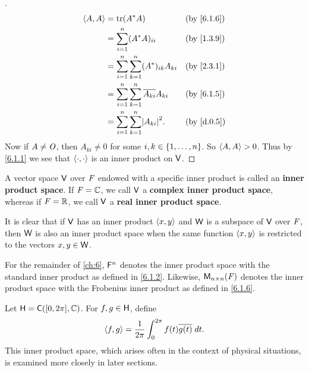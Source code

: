 \begin{proof}[]
\begin{align*}
    \inn{A, A} & = \tr(A^* A)                                           &  & \by{6.1.6} \\
               & = \sum_{i = 1}^n (A^* A)_{i i}                         &  & \by{1.3.9} \\
               & = \sum_{i = 1}^n \sum_{k = 1}^n (A^*)_{i k} A_{k i}    &  & \by{2.3.1} \\
               & = \sum_{i = 1}^n \sum_{k = 1}^n \conj{A_{k i}} A_{k i} &  & \by{6.1.5} \\
               & = \sum_{i = 1}^n \sum_{k = 1}^n \abs{A_{k i}}^2.       &  & \by{d.0.5}
  \end{align*}
  Now if \(A \neq \mathit{O}\), then \(A_{k i} \neq 0\) for some \(i, k \in \left\lbrace1, \dots, n\right\rbrace\).
  So \(\left\langle A, A\right\rangle > 0\).
  Thus by \cref{6.1.1} we see that \(\left\langle\cdot, \cdot\right\rangle\) is an inner product on \(\mathsf{V}\).
\end{proof}

\begin{defn}\label{6.1.7}
  A vector space \(\mathsf{V}\) over \(\mathit{F}\) endowed with a specific inner product is called an \textbf{inner product space}.
  If \(\mathit{F} = \mathbb{C}\), we call \(\mathsf{V}\) a \textbf{complex inner product space}, whereas if \(\mathit{F} = \mathbb{R}\), we call \(\mathsf{V}\) a \textbf{real inner product space}.

  It is clear that if \(\mathsf{V}\) has an inner product \(\left\langle x, y\right\rangle\) and \(\mathsf{W}\) is a subspace of \(\mathsf{V}\) over \(\mathit{F}\), then \(\mathsf{W}\) is also an inner product space when the same function \(\left\langle x, y\right\rangle\) is restricted to the vectors \(x, y \in \mathsf{W}\).
\end{defn}

\begin{note}
  For the remainder of \cref{ch:6}, \(\mathsf{F}^n\) denotes the inner product space with the standard inner product as defined in \cref{6.1.2}.
  Likewise, \(\ms[n][n][\F]\) denotes the inner product space with the Frobenius inner product as defined in \cref{6.1.6}.
\end{note}

\begin{eg}\label{6.1.8}
  Let \(\vs{H} = \cfs([0, 2 \pi], \C)\).
  For \(f, g \in \mathsf{H}\), define
  \[
    \left\langle f, g\right\rangle = \dfrac{1}{2 \pi} \int_0^{2 \pi} f(t) \overline{g(t)} \; dt.
  \]
  This inner product space, which arises often in the context of physical situations, is examined more closely in later sections.
\end{eg}

